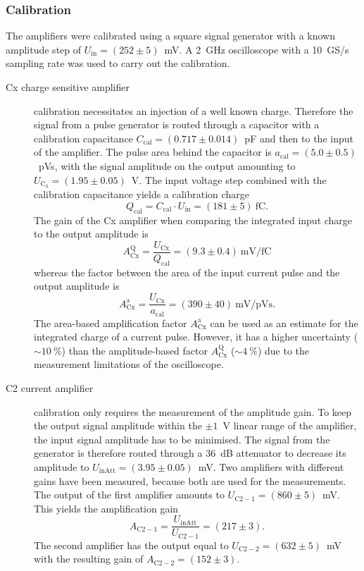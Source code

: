 \subsubsection{Calibration}
The amplifiers were calibrated using a square signal generator with a known amplitude step of $U_{\mathrm{in}}=(252\pm5)$~mV. A 2~GHz oscilloscope with a 10~GS/s sampling rate was used to carry out the calibration. 

\begin{description}
\item[Cx charge sensitive amplifier] calibration necessitates an injection of a well known charge. Therefore the signal from a pulse generator is routed through a capacitor with a calibration capacitance $C_{\mathrm{cal}}=(0.717\pm0.014)$~pF and then to the input of the amplifier. The pulse area behind the capacitor is $a_{\mathrm{cal}}=(5.0\pm0.5)$~pVs, with the signal amplitude on the output amounting to $U_{\mathrm{C_x}}=(1.95\pm0.05)$~V. The input voltage step combined with the calibration capacitance yields a calibration charge
\begin{equation}
Q_{\mathrm{cal}}=C_{\mathrm{cal}}\cdot U_{\mathrm{in}}=(181\pm5)~\mathrm{fC}.
\end{equation}
The gain of the Cx amplifier when comparing the integrated input charge to the output amplitude is 
\begin{equation}
A^{\mathrm{Q}}_{\mathrm{Cx}}=\frac{U_{\mathrm{Cx}}}{Q_{\mathrm{cal}} }=(9.3\pm0.4)~\mathrm{mV/fC}
\end{equation}
whereas the factor between the area of the input current pulse and the output amplitude is 
\begin{equation}
A^{\mathrm{a}}_{\mathrm{Cx}}=\frac{U_{\mathrm{Cx}}}{a_{\mathrm{cal}} }=(390\pm40)~\mathrm{mV/pVs}. 
\end{equation}
The area-based amplification factor $A^{\mathrm{a}}_{\mathrm{Cx}}$ can be used as an estimate for the integrated charge of a current pulse. However, it has a higher uncertainty ($\sim10~\%$) than the amplitude-based factor $A^{\mathrm{Q}}_{\mathrm{Cx}}$ ($\sim4~\%$) due to the measurement limitations of the oscilloscope.

\item[C2 current amplifier] calibration only requires the measurement of the amplitude gain. To keep the output signal amplitude within the $\pm1$~V linear range of the amplifier, the input signal amplitude has to be minimised. The signal from the generator is therefore routed through a 36~dB attenuator to decrease its amplitude to $U_{\mathrm{inAtt}}=(3.95\pm0.05)$~mV. Two amplifiers with different gains have been measured, because both are used for the measurements. The output of the first amplifier amounts to $U_{\mathrm{C2-1}}=(860\pm5)$~mV. This yields the amplification gain 
\begin{equation}
A_{\mathrm{C2-1}}=\frac{U_{\mathrm{inAtt}}}{U_{\mathrm{C2-1}}} =(217\pm3). 
\end{equation}
The second amplifier has the output equal to $U_{\mathrm{C2-2}}=(632\pm5)$~mV with the resulting gain of $A_{\mathrm{C2-2}}=(152\pm3)$. 
\end{description}


